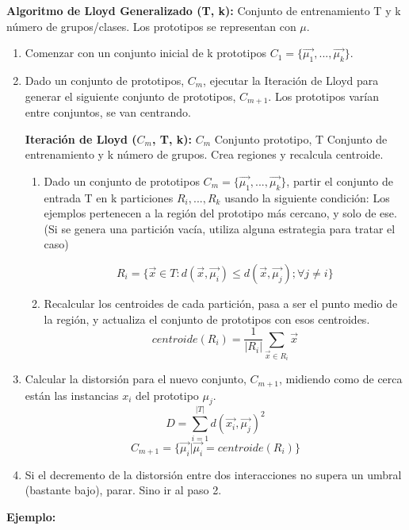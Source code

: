 \documentclass[12pt]{report} %
\begin{document}
\textbf{Algoritmo de Lloyd Generalizado (T, k):} Conjunto de entrenamiento T y k número de grupos/clases. Los prototipos se representan con $\mu$.

\begin{enumerate}
  \item Comenzar con un conjunto inicial de k prototipos $C_1 = \{\vec{\mu_1}, ..., \vec{\mu_k} \}$.
  \item Dado un conjunto de prototipos, $C_m$, ejecutar la Iteración de Lloyd para generar el siguiente conjunto de prototipos, $C_{m+1}$. Los prototipos varían entre conjuntos, se van centrando.
  
  \textbf{Iteración de Lloyd ($C_m$, T, k):} $C_m$ Conjunto prototipo, T Conjunto de entrenamiento y k número de grupos. Crea regiones y recalcula centroide.
  \begin{enumerate}
    \item Dado un conjunto de prototipos $C_m = \{\vec{\mu_1}, ..., \vec{\mu_k} \}$, partir el conjunto de entrada T en k particiones $R_i, ..., R_k$ usando la siguiente condición: Los ejemplos pertenecen a la región del prototipo más cercano, y solo de ese. (Si se genera una partición vacía, utiliza alguna estrategia para tratar el caso)
    
    $$R_i = \{ \vec{x} \in T: d(\vec{x}, \vec{\mu_i}) \leq d(\vec{x}, \vec{\mu_j}); \forall j \neq i \}$$
    
    \item Recalcular los centroides de cada partición, pasa a ser el punto medio de la región, y actualiza el conjunto de prototipos con esos centroides.
    $$centroide(R_i) = \frac{1}{|R_i|} \sum_{\vec{x} \in R_i} \vec{x}$$
  \end{enumerate}
  \item Calcular la distorsión para el nuevo conjunto, $C_{m+1}$, midiendo como de cerca están las instancias $x_i$ del prototipo $\mu_j$.
  $$D = \sum^{|T|}_{i=1} d( \vec{x_i}, \vec{\mu_j})^2$$
  $$C_{m+1} = \{\vec{\mu_i}|\vec{\mu_i} = centroide(R_i) \}$$
  \item Si el decremento de la distorsión entre dos interacciones no supera un umbral (bastante bajo), parar. Sino ir al paso 2. 
\end{enumerate}

\textbf{Ejemplo:}
\end{document}
